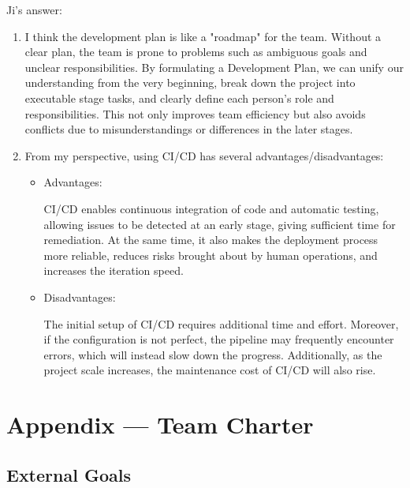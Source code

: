 \documentclass{article}
\begin{document}
Ji's answer:
\begin{enumerate}
  \item I think the development plan is like a "roadmap" for the team. Without a clear plan, the team is prone to 
problems such as ambiguous goals and unclear responsibilities. By formulating a Development Plan, we can unify our 
understanding from the very beginning, break down the project into executable stage tasks, and clearly define each 
person's role and responsibilities. This not only improves team efficiency but also avoids conflicts due to 
misunderstandings or differences in the later stages.
  \item From my perspective, using CI/CD has several advantages/disadvantages:
  \begin{itemize}
    \item Advantages:
      
        CI/CD enables continuous integration of code and automatic testing, allowing issues to be detected at 
      an early stage, giving sufficient time for remediation. At the same time, it also makes the deployment 
      process more reliable, reduces risks brought about by human operations, and increases the iteration speed.
      
    \item Disadvantages:
      
        The initial setup of CI/CD requires additional time and effort. Moreover, if the configuration is not 
        perfect, the pipeline may frequently encounter errors, which will instead slow down the progress. 
        Additionally, as the project scale increases, the maintenance cost of CI/CD will also rise.
      
  \end{itemize}
\end{enumerate}


\section*{Appendix --- Team Charter}


\subsection*{External Goals}
\end{document}
